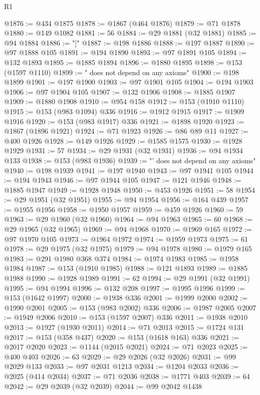 \begin{lexlean}{R1}
\begin{coremodule}
{{{{{{{{{{{{{{{{{{{{{{{{{{{{{{{{{{{{{{{{{{{{{{{{{{{{{{{{{{{{{{{{{{{{{{{{{{{{{{{{{{{{{{{{{{{{{{{{{{{{{{{{{{{{{{{{{{{{{{{{{{{{{{{{{{{{{{{{{{{{{{{{{{{{{{{{{{{{{{{{{{{{{{{{{{{{{{{{{{{{{{{{{{@1876 := @434 @1875
@1878 := @1867 (@464 @1876)
@1879 := @71 @1878
@1880 := @149 @1082
@1881 := 56
@1884 := @29 @1881 (@32 @1881)
@1885 := @94 @1884
@1886 := "]"
@1887 := @198 @1886
@1888 := @197 @1887
@1890 := @97 @1888 @105
@1891 := @194 @1890
@1893 := @97 @1891 @105
@1894 := @132 @1893
@1895 := @1885 @1894
@1896 := @1880 @1895
@1898 := @153 (@1597 @1110)
@1899 := " does not depend on any axioms"
@1900 := @198 @1899
@1901 := @197 @1900
@1903 := @97 @1901 @105
@1904 := @194 @1903
@1906 := @97 @1904 @105
@1907 := @132 @1906
@1908 := @1885 @1907
@1909 := @1880 @1908
@1910 := @954 @158
@1912 := @153 (@1910 @1110)
@1915 := @153 (@983 @1094) @336
@1916 := @1912 @1915
@1917 := @1909 @1916
@1920 := @153 (@983 @1917) @336
@1921 := @1898 @1920
@1923 := @1867 (@1896 @1921)
@1924 := @71 @1923
@1926 := @86 @89 @11
@1927 := @400 @1926
@1928 := @149 @1926
@1929 := @1585 @1575
@1930 := @1928 @1929
@1931 := 57
@1934 := @29 @1931 (@32 @1931)
@1936 := @94 @1934 @133
@1938 := @153 (@983 @1936)
@1939 := "' does not depend on any axioms"
@1940 := @198 @1939
@1941 := @197 @1940
@1943 := @97 @1941 @105
@1944 := @194 @1943
@1946 := @97 @1944 @105
@1947 := @121 @1946
@1948 := @1885 @1947
@1949 := @1928 @1948
@1950 := @453 @1926
@1951 := 58
@1954 := @29 @1951 (@32 @1951)
@1955 := @94 @1954
@1956 := @164 @439
@1957 := @1955 @1956
@1958 := @1950 @1957
@1959 := @459 @1926
@1960 := 59
@1963 := @29 @1960 (@32 @1960)
@1964 := @94 @1963
@1965 := 60
@1968 := @29 @1965 (@32 @1965)
@1969 := @94 @1968
@1970 := @1969 @165
@1972 := @97 @1970 @105
@1973 := @1964 @1972
@1974 := @1959 @1973
@1975 := 61
@1978 := @29 @1975 (@32 @1975)
@1979 := @94 @1978
@1980 := @1979 @165
@1983 := @291 @1980 @368 @374
@1984 := @1974 @1983
@1985 := @1958 @1984
@1987 := @153 (@1910 @1985)
@1988 := @121 @1893
@1989 := @1885 @1988
@1990 := @1928 @1989
@1991 := 62
@1994 := @29 @1991 (@32 @1991)
@1995 := @94 @1994
@1996 := @132 @208
@1997 := @1995 @1996
@1999 := @153 (@1642 @1997)
@2000 := @1938 @336
@2001 := @1999 @2000
@2002 := @1990 @2001
@2005 := @153 (@983 @2002) @336
@2006 := @1987 @2005
@2007 := @1949 @2006
@2010 := @153 (@1597 @2007) @336
@2011 := @1938 @2010
@2013 := @1927 (@1930 @2011)
@2014 := @71 @2013
@2015 := @1724 @131
@2017 := @153 (@358 @437)
@2020 := @153 (@1618 @163) @336
@2021 := @2017 @2020
@2023 := @1144 (@2015 @2021)
@2024 := @71 @2023
@2025 := @400 @403
@2026 := 63
@2029 := @29 @2026 (@32 @2026)
@2031 := @99 @2029 @133
@2033 := @97 @2031 @1213
@2034 := @1204 @2033
@2036 := @2025 (@414 @2034)
@2037 := @71 @2036
@2038 := @1771 @403
@2039 := 64
@2042 := @29 @2039 (@32 @2039)
@2044 := @99 @2042 @1438
}}}}}}}}}}}}}}}}}}}}}}}}}}}}}}}}}}}}}}}}}}}}}}}}}}}}}}}}}}}}}}}}}}}}}}}}}}}}}}}}}}}}}}}}}}}}}}}}}}}}}}}}}}}}}}}}}}}}}}}}}}}}}}}}}}}}}}}}}}}}}}}}}}}}}}}}}}}}}}}}}}}}}}}}}}}}}}}}}}}}}}}}}}
\end{coremodule}
\end{lexlean}
